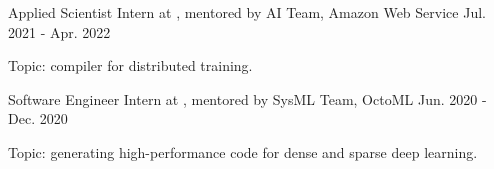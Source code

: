 

\begin{cventries}

\cventry
{Applied Scientist Intern at , mentored by } %
{AI Team, Amazon Web Service} %
{Jul. 2021 - Apr. 2022} %
{} %
{
	\begin{cvitems} %
		\item{Topic: compiler for distributed training.}
	\end{cvitems}
}

\cventry
	{Software Engineer Intern at , mentored by } %
	{SysML Team, OctoML} %
	{Jun. 2020 - Dec. 2020} %
	{} %
	{
		\begin{cvitems} %
			\item{Topic: generating high-performance code for dense and sparse deep learning.}
		\end{cvitems}
    }

\end{cventries}
